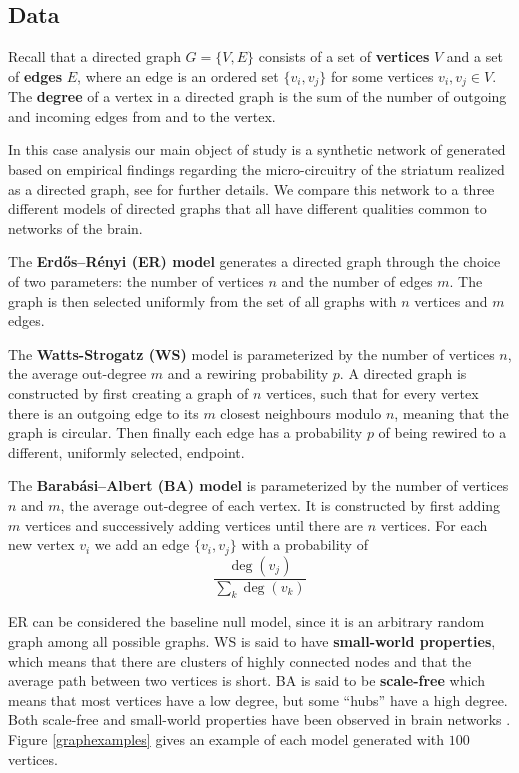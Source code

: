 \subsection{Data}

Recall that a directed graph $G=\{V,E\}$ consists of a set of \textbf{vertices} $V$ and a set of \textbf{edges} $E$, where an edge is an ordered set $\{v_{i},v_{j}\}$ for some vertices $v_{i},v_{j} \in V$. The \textbf{degree} of a vertex in a directed graph is the sum of the number of outgoing and incoming edges from and to the vertex.


In this case analysis our main object of study is a synthetic network of generated based on empirical findings regarding the micro-circuitry of the striatum realized as a directed graph, see \cite{Hjorth202000671} for further details. We compare this network to a three different models of directed graphs that all have different qualities common to networks of the brain.

\begin{definition}
The \textbf{Erdős–Rényi (ER) model} generates a directed graph through the choice of two parameters: the number of vertices $n$ and the number of edges $m$. The graph is then selected uniformly from the set of all graphs with $n$ vertices and $m$ edges.
\end{definition}

\begin{definition}
The \textbf{Watts-Strogatz (WS)} model is parameterized by the number of vertices $n$, the average out-degree $m$ and a rewiring probability $p$. A directed graph is constructed by first creating a graph of $n$ vertices, such that for every vertex there is an outgoing edge to its $m$ closest neighbours modulo $n$, meaning that the graph is circular. Then finally each edge has a probability $p$ of being rewired to a different, uniformly selected, endpoint.
\end{definition}

\begin{definition}
  The \textbf{Barabási–Albert (BA) model} is parameterized by the number of vertices $n$ and $m$, the average out-degree of each vertex. It is constructed by first adding $m$ vertices and successively adding vertices until there are $n$ vertices. For each new vertex $v_{i}$ we add an edge $\{v_{i},v_{j}\}$  with a probability of
  \[
    \frac{\deg(v_{j})}{\sum_{k} \deg(v_{k})}
  \]
\end{definition}
ER can be considered the baseline null model, since it is an arbitrary random graph among all possible graphs. WS is said to have \textbf{small-world properties}, which means that there are clusters of highly connected nodes and that the average path between two vertices is short. BA is said to be \textbf{scale-free} which means that most vertices have a low degree, but some ``hubs'' have a high degree. Both scale-free and small-world properties have been observed in brain networks \cite{SPORNS2004418}. Figure \ref{graphexamples} gives an example of each model generated with $100$ vertices.

